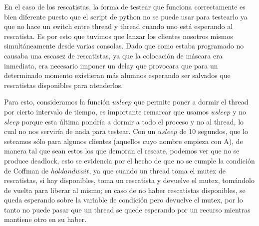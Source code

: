 \documentclass[a4paper, 11pt]{article}
\begin{document}
En el caso de los rescatistas, la forma de testear que funciona correctamente es bien diferente puesto que el script de python no se puede usar para testearlo ya que no hace un switch entre thread y thread cuando uno está esperando al rescatista. Es por esto que tuvimos que lanzar los clientes nosotros mismos simultáneamente desde varias consolas. Dado que como estaba programado no causaba una escasez de rescatistas, ya que la colocación de máscara era inmediata, era necesario imponer un delay que provocara que para un determinado momento existieran más alumnos esperando ser salvados que rescatistas disponibles para atenderlos. 

Para esto, consideramos la función $usleep$ que permite poner a dormir el thread por cierto intervalo de tiempo, es importante remarcar que usamos $usleep$ y no $sleep$ porque esta última pondría a dormir a todo el proceso y no al thread, lo cual no nos serviría de nada para testear. Con un $usleep$ de 10 segundos, que lo seteamos sólo para algunos clientes (aquellos cuyo nombre empieza con A), de manera tal que sean estos los que demoran el rescate, podemos ver que no se produce deadlock, esto se evidencia por el hecho de que no se cumple la condición de Coffman de $hold and wait$, ya que cuando un thread toma el mutex de rescatistas, si hay disponibles, toma un rescatista y devuelve el mutex, tomándolo de vuelta para liberar al mismo; en caso de no haber rescatistas disponibles, se queda esperando sobre la variable de condición pero devuelve el mutex, por lo tanto no puede pasar que un thread se quede esperando por un recurso mientras mantiene otro en su haber.
\end{document}
